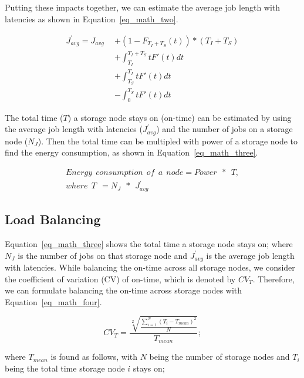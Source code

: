 \documentclass[preprint,12pt]{elsarticle}
\begin{document}
Putting these impacts together, we can estimate the average
job length with latencies as 
shown in Equation~\eqref{eq_math_two}.

\begin{equation}
\label{eq_math_two}
\begin{aligned}
J_{avg}^{'} = J_{avg}\ \ &+ (1-F_{T_I+T_S}(t))*(T_I+T_S) \\
                       &+ \int_{T_I}^{T_I+T_S}tF'(t)dt \\
                       &+ \int_{T_S}^{T_I}tF'(t)dt \\
                       &- \int_{0}^{T_S}tF'(t)dt
\end{aligned}
\end{equation}
\hfill

The total time ($T$) a storage node stays on (on-time) can be estimated by using
the average job length with latencies ($J_{avg}^{'}$) and the number of jobs
on a storage node ($N_J$). Then the total time can be multipled with power
of a storage node to find the energy consumption, as shown in Equation~\eqref{eq_math_three}.

\begin{equation}
\begin{gathered}
Energy\ \ consumption\ \ of\ \ a\ \ node = Power\ \ *\ \ T,\\
where\ \ T\ \ = N_J\ \ *\ \ J_{avg}^{'}
\end{gathered}
\label{eq_math_three}
\end{equation}
\hfill

\subsection{Load Balancing}
Equation~\eqref{eq_math_three} shows the total time a storage node stays on;
where $N_J$ is the number of jobs on that storage node and $J_{avg}^{'}$
is the average job length with latencies. While balancing the on-time across
all storage nodes, we consider the coefficient of variation (CV) of on-time,
which is denoted by $CV_{T}$. Therefore, we can formulate balancing the
on-time across storage nodes with Equation~\eqref{eq_math_four}.

\begin{equation}
\label{eq_math_four}
CV_{T} = \frac{\sqrt[2]{\frac{\sum\limits_{i=1}^N (T_i - T_{mean}) ^ 2}{N}}}{T_{mean}};
\end{equation}
\hfill

where $T_{mean}$ is found as follows, with $N$ being the number of storage nodes
and $T_i$ being the total time storage node $i$ stays on;
\end{document}
